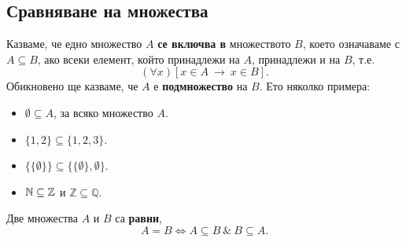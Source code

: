 


\subsection*{Сравняване на множества}

Казваме, че едно множество $A$ {\bf се включва в} множеството $B$, което означаваме с $A \subseteq B$, 
ако всеки елемент, който принадлежи на $A$, принадлежи и на $B$, т.е.
\[(\forall x)[x \in A\ \rightarrow\ x \in B].\]
Обикновено ще казваме, че $A$ е {\bf подмножество} на $B$.
Ето няколко примера:
\begin{itemize}
\item 
  $\emptyset \subseteq A$, за всяко множество $A$.
\item
  $\{1,2\} \subseteq \{1,2,3\}$.
\item
  $\{\{\emptyset\}\} \subseteq \{\{\emptyset\},\emptyset\}$.
\item
  $\mathbb{N} \subseteq \mathbb{Z}$ и $\mathbb{Z} \subseteq \mathbb{Q}$.
\end{itemize}
Две множества $A$ и $B$ са {\bf равни},
\[A = B \iff A \subseteq B\ \&\ B\subseteq A.\]

